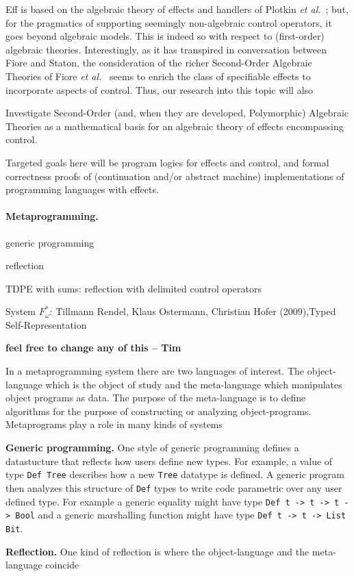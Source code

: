 \documentclass[11pt,twocolumn]{article}
\newcounter{CC}
\newenvironment{resenumerate}
  {\begin{list}{[\textbf{\arabic{CC}]}}
  {\usecounter{CC}
   \setlength{\topsep}{2pt}
   \setlength{\partopsep}{2pt}
   \setlength{\itemsep}{2.5pt}
   \setlength{\parsep}{2.5pt}
   \setlength{\leftmargin}{1.65em}
   \setlength{\labelwidth}{1.15em}
 }}
  {\end{list}}
\newcommand{\hide}[1]{}
\newcommand{\hidenote}{\hide}
\newcommand{\etal}{\emph{et al.}}
\begin{document}
Eff is based on the algebraic theory of effects and handlers of Plotkin
\etal~\cite{PlotkinPowerAlgOpsAndGenEffs,PlotkinPretnar};
but, for the pragmatics of supporting seemingly non-algebraic control
operators, it goes beyond algebraic models.  This is indeed so with
respect to (first-order) algebraic theories.  Interestingly, as it has
transpired in conversation between Fiore and Staton, the consideration of
the richer Second-Order Algebraic Theories of Fiore
\etal~\cite{FioreHurLMCS,FioreMahmoud} seems to enrich the class of
specifiable effects to incorporate aspects of control.  Thus, our research
into this topic will also
\begin{resenumerate}\setcounter{CC}{5}
\item
  Investigate Second-Order (and, when they are developed, Polymorphic)
  Algebraic Theories as a mathematical basis for an algebraic theory of
  effects encompassing control.
\end{resenumerate}
Targeted goals here will be program logics for effects and control, and formal
correctness proofs of (continuation and/or abstract machine) implementations
of programming languages with effects.

\hidenote{Dependent CBPV}

\paragraph{Metaprogramming.}
\label{MetaprogrammingParagraph}

{\color{red}

  generic programming

  reflection

  TDPE with sums: reflection with delimited control operators

  System $F_\omega^*$: Tillmann Rendel, Klaus Ostermann, Christian
  Hofer (2009),Typed Self-Representation

{\bf feel free to change any of this -- Tim}

In a metaprogramming system there are two languages of interest. The
object-language which is the object of study and the meta-language which
manipulates object programs as data. The purpose of the meta-language is
to define algorithms for the purpose of constructing or analyzing
object-programs. Metaprograms play a role in many kinds of systems

{\bf Generic programming.}
One style of generic programming defines a datastucture that reflects how
users define new types. For example, a value of type \verb+Def Tree+
describes how a new \verb+Tree+ datatype is defined. A generic program then
analyzes this structure of \verb+Def+ types to write code parametric over
any user defined type. For example a generic equality might have type
\verb+Def t -> t -> t -> Bool+ and a generic marshalling function
might have type \verb+Def t -> t -> List Bit+. 

{\bf Reflection.} One kind of reflection is where the object-language and
the meta-language coincide
}
\end{document}
